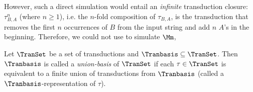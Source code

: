 However, such a direct simulation would entail an \emph{infinite} transduction closure:
$\tau^n_{B, A}$  (where $n \ge 1$), i.e. the $n$-fold composition of $\tau_{B,A}$, is the transduction that removes the first $n$ occurrences of $B$ from the input string and add $n$ $A$'s in the beginning. 
Therefore, we could not use {\TrPDS} to simulate $\Mm$, 

\begin{definition}\label{def-ubasis}
Let $\TranSet$ be a set of transductions and $\Tranbasis \subseteq \TranSet$. Then $\Tranbasis$ is called a \emph{union-basis} of $\TranSet$ if each $\tau \in \TranSet$ is equivalent to a finite union of transductions from $\Tranbasis$ (called a $\Tranbasis$-representation of $\tau$). 
\end{definition}

